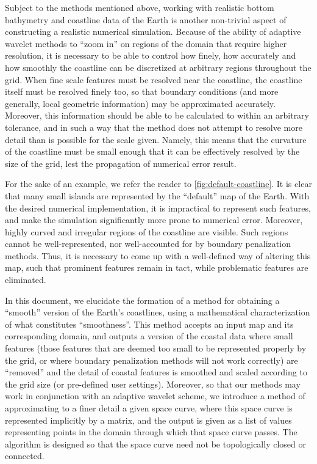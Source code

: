 \documentclass{article}
\begin{document}
Subject to the methods mentioned above, working with realistic
bottom bathymetry and coastline data of the Earth is another
non-trivial aspect of constructing a realistic numerical
simulation. Because of the ability of adaptive wavelet methods to
``zoom in'' on regions of the domain that require higher resolution,
it is necessary to be able to control how finely, how accurately
and how smoothly the coastline can be discretized at arbitrary
regions throughout the grid. When fine scale features must be
resolved near the coastline, the coastline itself must be resolved
finely too, so that boundary conditions (and more generally, local
geometric information) may be approximated accurately. Moreover,
this information should be able to be calculated to within an
arbitrary tolerance, and in such a way that the method does not
attempt to resolve more detail than is possible for the scale
given. Namely, this means that the curvature of the coastline must
be small enough that it can be effectively resolved by the size of
the grid, lest the propagation of numerical error result.

For the sake of an example, we refer the reader to
\autoref{fig:default-coastline}. It is clear that many small
islands are represented by the ``default'' map of the Earth. With
the desired numerical implementation, it is impractical to
represent such features, and make the simulation significantly
more prone to numerical error. Moreover, highly curved and
irregular regions of the coastline are visible. Such regions
cannot be well-represented, nor well-accounted for by boundary
penalization methods. Thus, it is necessary to come up with a
well-defined way of altering this map, such that prominent
features remain in tact, while problematic features are
eliminated. 

In this document, we elucidate the formation of a method for
obtaining a ``smooth'' version of the Earth's coastlines, using a
mathematical characterization of what constitutes
``smoothness''. This method accepts an input map and its
corresponding domain, and outputs a version of the coastal data
where small features (\ie those features that are deemed too small
to be represented properly by the grid, or where boundary
penalization methods will not work correctly) are ``removed'' and
the detail of coastal features is smoothed and scaled according to
the grid size (or pre-defined user settings). Moreover, so that
our methods may work in conjunction with an adaptive wavelet
scheme, we introduce a method of approximating to a finer detail a
given space curve, where this space curve is represented
implicitly by a matrix, and the output is given as a list of
values representing points in the domain through which that space
curve passes. The algorithm is designed so that the space curve
need not be topologically closed or connected. 
\end{document}
